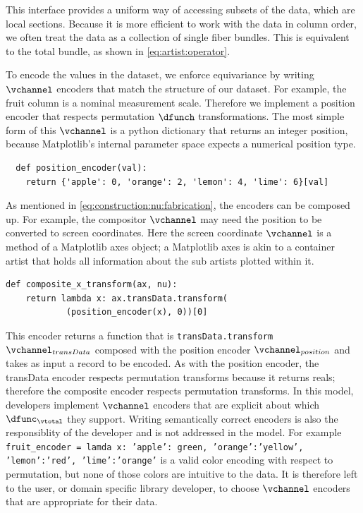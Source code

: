 \documentclass[10pt,journal,compsoc]{IEEEtran}
\theoremstyle{definition}
\theoremstyle{remark}
\begin{document}
This interface provides a uniform way of  accessing subsets of the data, which are local sections. Because it is more efficient to work with the data in column order, we often treat the data as a collection of single fiber bundles. This is equivalent to the total bundle, as shown in \autoref{eq:artist:operator}. 

To encode the values in the dataset, we enforce equivariance by writing $\vchannel$ encoders that match the structure of our dataset. For example, the fruit column is a nominal measurement scale. Therefore we implement a position encoder that respects permutation $\dfunch$ transformations. The most simple form of this $\vchannel$ is a python dictionary that returns an integer position, because Matplotlib's internal parameter space expects a numerical position type. 
\begin{verbatim}
  def position_encoder(val):
    return {'apple': 0, 'orange': 2, 'lemon': 4, 'lime': 6}[val]
\end{verbatim}
As mentioned in \autoref{eq:construction:nu:fabrication}, the encoders can be composed up. For example, the compositor $\vchannel$ may need the position to be converted to screen coordinates. Here the screen coordinate $\vchannel$ is a method of a Matplotlib axes object; a Matplotlib axes is akin to a container artist that holds all information about the sub artists plotted within it. 
\begin{verbatim}
def composite_x_transform(ax, nu):
    return lambda x: ax.transData.transform(
            (position_encoder(x), 0))[0]
\end{verbatim}
This encoder returns a function that is \texttt{transData.transform} $\vchannel_{transData}$ composed with the position encoder $\vchannel_{position}$ and takes as input a record to be encoded. As with the position encoder, the transData encoder respects permutation transforms because it returns reals; therefore the composite encoder respects permutation transforms. In this model, developers implement $\vchannel$ encoders that are explicit about which $\dfunc_{\vtotal}$ they support. Writing semantically correct encoders is also the responsiblity of the developer and is not addressed in the model. For example \texttt{fruit_encoder = lamda x: {'apple': green, 'orange':'yellow', 'lemon':'red', 'lime':'orange'}} is a valid color encoding with respect to permutation, but none of those colors are intuitive to the data. It is therefore left to the user, or domain specific library developer, to choose $\vchannel$ encoders that are appropriate for their data.
\end{document}
